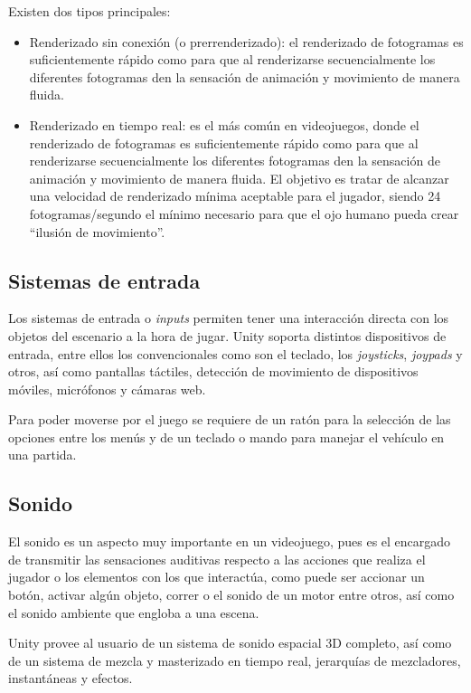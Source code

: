 Existen dos tipos principales:
\begin{itemize}
\tightlist
	\item Renderizado sin conexión (o prerrenderizado): el renderizado de fotogramas es suficientemente rápido como para que al renderizarse secuencialmente los diferentes fotogramas den la sensación de animación y movimiento de manera fluida.
	\item Renderizado en tiempo real: es el más común en videojuegos, donde el renderizado de fotogramas es suficientemente rápido como para que al renderizarse secuencialmente los diferentes fotogramas den la sensación de animación y movimiento de manera fluida. El objetivo es tratar de alcanzar una velocidad de renderizado mínima aceptable para el jugador, siendo 24 fotogramas/segundo el mínimo necesario para que el ojo humano pueda crear ``ilusión de movimiento''.
\end{itemize}

\subsection{Sistemas de entrada}

Los sistemas de entrada o \textit{inputs} permiten tener una interacción directa con los objetos del escenario a la hora de jugar. Unity soporta distintos dispositivos de entrada, entre ellos los convencionales como son el teclado, los \textit{joysticks}, \textit{joypads} y otros, así como pantallas táctiles, detección de movimiento de dispositivos móviles, micrófonos y cámaras web.

Para poder moverse por el juego se requiere de un ratón para la selección de las opciones entre los menús y de un teclado o mando para manejar el vehículo en una partida.

\subsection{Sonido}

El sonido es un aspecto muy importante en un videojuego, pues es el encargado de transmitir las sensaciones auditivas respecto a las acciones que realiza el jugador o los elementos con los que interactúa, como puede ser accionar un botón, activar algún objeto, correr o el sonido de un motor entre otros, así como el sonido ambiente que engloba a una escena.

Unity provee al usuario de un sistema de sonido espacial 3D completo, así como de un sistema de mezcla y masterizado en tiempo real, jerarquías de mezcladores, instantáneas y efectos.

